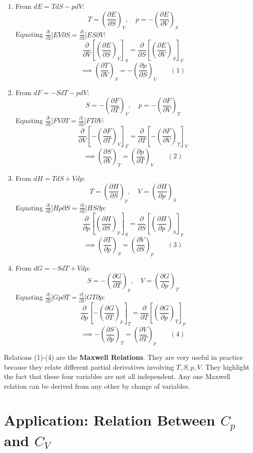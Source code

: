 \documentclass[11pt]{article}
\newcommand{\pderiv}[2]{\frac{\partial #1}{\partial #2}}
\begin{document}
\begin{enumerate}
    \item From $dE = T dS - p dV$:
    \[ T = \left(\pderiv{E}{S}\right)_V, \quad p = -\left(\pderiv{E}{V}\right)_S \]
    Equating $\pderiv[2]{E}{V \partial S} = \pderiv[2]{E}{S \partial V}$:
    \[ \pderiv{}{V} \left[ \left(\pderiv{E}{S}\right)_V \right]_S = \pderiv{}{S} \left[ \left(\pderiv{E}{V}\right)_S \right]_V \]
    \[ \implies \left( \pderiv{T}{V} \right)_S = - \left( \pderiv{p}{S} \right)_V \qquad (1) \]

    \item From $dF = -S dT - p dV$:
    \[ S = -\left(\pderiv{F}{T}\right)_V, \quad p = -\left(\pderiv{F}{V}\right)_T \]
    Equating $\pderiv[2]{F}{V \partial T} = \pderiv[2]{F}{T \partial V}$:
    \[ \pderiv{}{V} \left[ -\left(\pderiv{F}{T}\right)_V \right]_T = \pderiv{}{T} \left[ -\left(\pderiv{F}{V}\right)_T \right]_V \]
    \[ \implies \left( \pderiv{S}{V} \right)_T = \left( \pderiv{p}{T} \right)_V \qquad (2) \]

    \item From $dH = T dS + V dp$:
    \[ T = \left(\pderiv{H}{S}\right)_p, \quad V = \left(\pderiv{H}{p}\right)_S \]
    Equating $\pderiv[2]{H}{p \partial S} = \pderiv[2]{H}{S \partial p}$:
    \[ \pderiv{}{p} \left[ \left(\pderiv{H}{S}\right)_p \right]_S = \pderiv{}{S} \left[ \left(\pderiv{H}{p}\right)_S \right]_p \]
    \[ \implies \left( \pderiv{T}{p} \right)_S = \left( \pderiv{V}{S} \right)_p \qquad (3) \]

    \item From $dG = -S dT + V dp$:
    \[ S = -\left(\pderiv{G}{T}\right)_p, \quad V = \left(\pderiv{G}{p}\right)_T \]
    Equating $\pderiv[2]{G}{p \partial T} = \pderiv[2]{G}{T \partial p}$:
    \[ \pderiv{}{p} \left[ -\left(\pderiv{G}{T}\right)_p \right]_T = \pderiv{}{T} \left[ \left(\pderiv{G}{p}\right)_T \right]_p \]
    \[ \implies -\left( \pderiv{S}{p} \right)_T = \left( \pderiv{V}{T} \right)_p \qquad (4) \]
\end{enumerate}
Relations (1)-(4) are the \textbf{Maxwell Relations}. They are very useful in practice because they relate different partial derivatives involving $T, S, p, V$. They highlight the fact that these four variables are not all independent. Any one Maxwell relation can be derived from any other by change of variables.

\section*{Application: Relation Between $C_p$ and $C_V$}
\end{document}
